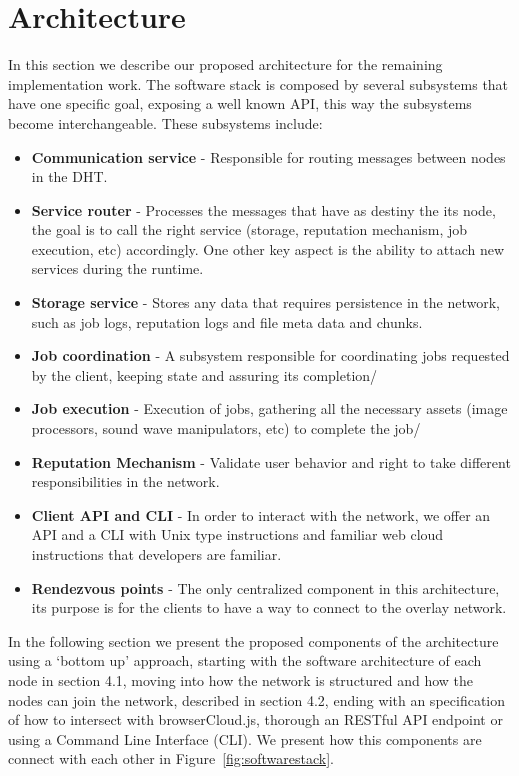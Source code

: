 
% 
% 

\section{Architecture}

In this section we describe our proposed architecture for the remaining implementation work. The software stack is composed by several subsystems that have one specific goal, exposing a well known API, this way the subsystems become interchangeable. These subsystems include:

\begin{itemize}
  \item \textbf{Communication service} - Responsible for routing messages between nodes in the DHT.
  \item \textbf{Service router} - Processes the messages that have as destiny the its node, the goal is to call the right service (storage, reputation mechanism, job execution, etc) accordingly. One other key aspect is the ability to attach new services during the runtime.
  \item \textbf{Storage service} - Stores any data that requires persistence in the network, such as job logs, reputation logs and file meta data and chunks.
  \item \textbf{Job coordination} - A subsystem responsible for coordinating jobs requested by the client, keeping state and assuring its completion/
  \item \textbf{Job execution} - Execution of jobs, gathering all the necessary assets (image processors, sound wave manipulators, etc) to complete the job/
  \item \textbf{Reputation Mechanism} - Validate user behavior and right to take different responsibilities in the network.
  \item \textbf{Client API and CLI} - In order to interact with the network, we offer an API and a CLI with Unix type instructions and familiar web cloud instructions that developers are familiar.
  \item \textbf{Rendezvous points} - The only centralized component in this architecture, its purpose is for the clients to have a way to connect to the overlay network. 
\end{itemize}


In the following section we present the proposed components of the architecture using a `bottom up' approach, starting with the software architecture of each node in section 4.1, moving into how the network is structured and how the nodes can join the network, described in section 4.2, ending with an specification of how to intersect with browserCloud.js, thorough an RESTful API endpoint or using a Command Line Interface (CLI). We present how this components are connect with each other in Figure~\ref{fig:softwarestack}.

